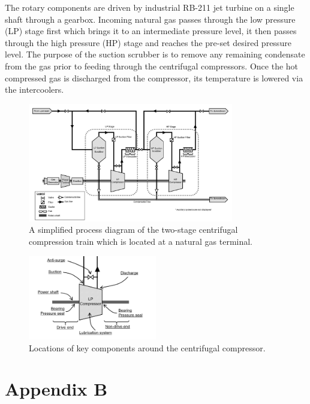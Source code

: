 \documentclass[runningheads]{llncs}
\begin{document}
The rotary components are driven by industrial RB-211 jet turbine on a single shaft through a gearbox. Incoming natural gas passes through the low pressure (LP) stage first which brings it to an intermediate pressure level, it then passes through the high pressure (HP) stage and reaches the pre-set desired pressure level. The purpose of the suction scrubber is to remove any remaining condensate from the gas prior to feeding through the centrifugal compressors. Once the hot compressed gas is discharged from the compressor, its temperature is lowered via the intercoolers.

\begin{figure}[H]
	\centering
	\includegraphics[width=0.8\textwidth]{process_diagram.png}
	\caption{A simplified process diagram of the two-stage centrifugal compression train which is located at a natural gas terminal.}
	\label{fig:process_diagram}
\end{figure}

\begin{figure}[H]
	\centering
	\includegraphics[width=0.5\textwidth]{lp-stage.png}
	\caption{Locations of key components around the centrifugal compressor.}
	\label{fig:lp_stage}
\end{figure}

\newpage
\section*{Appendix B}
\end{document}
